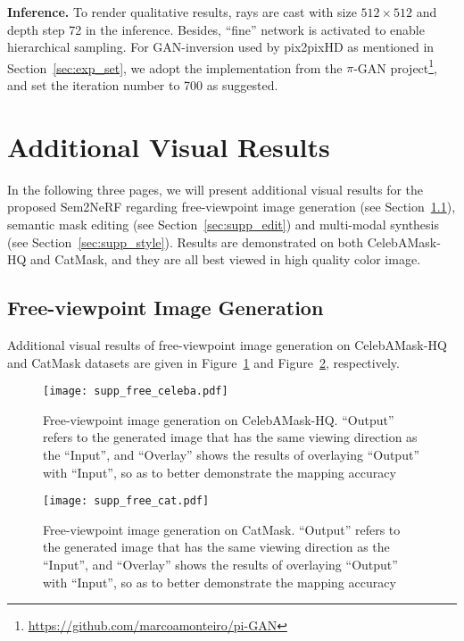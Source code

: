 \documentclass[runningheads]{llncs}
\begin{document}
\textbf{Inference.} To render qualitative results, rays are cast with size $512\times512$ and depth step 72 in the inference. Besides, ``fine'' network is activated to enable hierarchical sampling. For GAN-inversion used by pix2pixHD as mentioned in Section~\ref{sec:exp_set}, we adopt the implementation from the $\pi$-GAN project\footnote{\url{https://github.com/marcoamonteiro/pi-GAN}}, and set the iteration number to 700 as suggested.



\section{Additional Visual Results} \label{sec:result}
 
In the following three pages, we will present additional visual results for the proposed Sem2NeRF regarding free-viewpoint image generation (see Section~\ref{sec:supp_free}), semantic mask editing (see Section~\ref{sec:supp_edit}) and multi-modal synthesis (see Section~\ref{sec:supp_style}). Results are demonstrated on both CelebAMask-HQ and CatMask, and they are all best viewed in high quality color image.


\clearpage

\subsection{Free-viewpoint Image Generation} \label{sec:supp_free}

Additional visual results of free-viewpoint image generation on CelebAMask-HQ and CatMask datasets are given in Figure~\ref{fig:supp_free_celeba} and Figure~\ref{fig:supp_free_cat}, respectively. 

\begin{figure}[h!]
    \centering
    \texttt{[image: supp\_free\_celeba.pdf]}
\caption{Free-viewpoint image generation on CelebAMask-HQ. ``Output'' refers to the generated image that has the same viewing direction as the ``Input'', and ``Overlay'' shows the results of overlaying ``Output'' with ``Input'', so as to better demonstrate the mapping accuracy}
\label{fig:supp_free_celeba}
\end{figure}



\begin{figure}[h!]
    \centering
    \texttt{[image: supp\_free\_cat.pdf]}
\caption{Free-viewpoint image generation on CatMask. ``Output'' refers to the generated image that has the same viewing direction as the ``Input'', and ``Overlay'' shows the results of overlaying ``Output'' with ``Input'', so as to better demonstrate the mapping accuracy}
\label{fig:supp_free_cat}
\end{figure}
\end{document}
